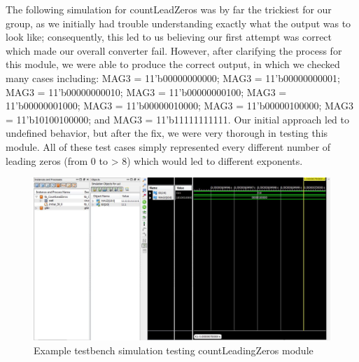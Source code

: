 \documentclass{article}
\begin{document}
The following simulation for countLeadZeros was by far the trickiest for our group, as we initially had trouble understanding exactly what the output was to look like; consequently, this led to us believing our first attempt was correct which made our overall converter fail.  However, after clarifying the process for this module, we were able to produce the correct output, in which we checked many cases including: MAG3 = 11'b00000000000; MAG3 = 11'b00000000001; MAG3 = 11'b00000000010; MAG3 = 11'b00000000100; MAG3 = 11'b00000001000; MAG3 = 11'b00000010000; MAG3 = 11'b00000100000; MAG3 = 11'b10100100000; and MAG3 = 11'b11111111111.  Our initial approach led to undefined behavior, but after the fix, we were very thorough in testing this module.  All of these test cases simply represented every different number of leading zeros (from 0 to > 8) which would led to different exponents.

\begin{figure}[H]
	\begin{center}
		\includegraphics[width=1\textwidth]{sim2.png} 
		\caption{Example testbench simulation testing countLeadingZeros module}
	\end{center}
\end{figure}



%

%

\end{document}

